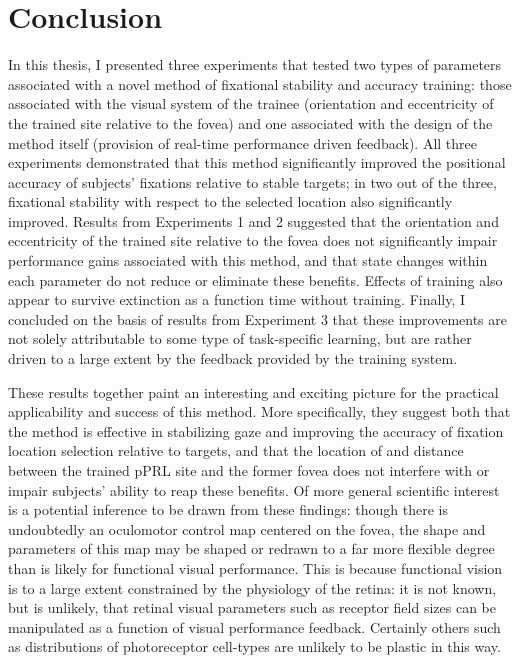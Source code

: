 \chapter{Conclusion}
\label{conclusion}

In this thesis, I presented three experiments that tested two types of parameters associated with a novel method of fixational stability and accuracy training: those associated with the visual system of the trainee (orientation and eccentricity of the trained site relative to the fovea) and one associated with the design of the method itself (provision of real-time performance driven feedback). All three experiments demonstrated that this method  significantly improved the positional accuracy of subjects' fixations relative to stable targets; in two out of the three, fixational stability with respect to the selected location also significantly improved. Results from Experiments 1 and 2 suggested that the orientation and eccentricity of the trained site relative to the fovea does not significantly impair performance gains associated with this method, and that state changes within each parameter do not reduce or eliminate these benefits. Effects of training also appear to survive extinction as a function time without training. Finally, I concluded on the basis of results from Experiment 3 that these improvements are not solely attributable to some type of task-specific learning, but are rather driven to a large extent by the feedback provided by the training system.

These results together paint an interesting and exciting picture for the practical applicability and success of this method. More specifically, they suggest both that the method is effective in stabilizing gaze and improving the accuracy of fixation location selection relative to targets, and that the location of and distance between the trained pPRL site and the former fovea does not interfere with or impair subjects' ability to reap these benefits. Of more general scientific interest is a potential inference to be drawn from these findings: though there is undoubtedly an oculomotor control map centered on the fovea, the shape and parameters of this map may be shaped or redrawn to a far more flexible degree than is likely for functional visual performance. This is because functional vision is to a large extent constrained by the physiology of the retina: it is not known, but is unlikely, that retinal visual parameters such as receptor field sizes can be manipulated as a function of visual performance feedback. Certainly others such as distributions of photoreceptor cell-types are unlikely to be plastic in this way.

